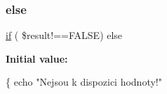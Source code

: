 \mbox{\label{day__data_8php_ac53b65f043f989d6c1ee7c3a9379db40}} 
\subsubsection{\texorpdfstring{else}{else}}
{\footnotesize\ttfamily \hyperlink{index_8php_a5bd83a7a52ff3be468b16a8c82e43673}{if} ( \$result!==F\+A\+L\+SE) else}

{\bfseries Initial value\+:}
\begin{DoxyCode}
\{
echo \textcolor{stringliteral}{"Nejsou k dispozici hodnoty!"}
\end{DoxyCode}
